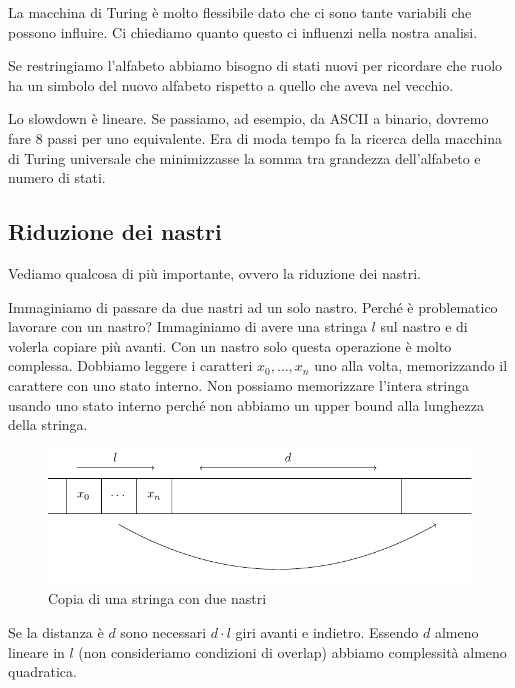 La macchina di Turing è molto flessibile dato che ci sono tante variabili che possono influire. Ci
chiediamo quanto questo ci influenzi nella nostra analisi.

Se restringiamo l'alfabeto abbiamo bisogno di stati nuovi per ricordare che ruolo ha un simbolo del
nuovo alfabeto rispetto a quello che aveva nel vecchio.

Lo slowdown è lineare. Se passiamo, ad esempio, da ASCII a binario, dovremo fare 8 passi per uno
equivalente. Era di moda tempo fa la ricerca della macchina di Turing universale che minimizzasse la
somma tra grandezza dell'alfabeto e numero di stati.


\subsection{Riduzione dei nastri}

Vediamo qualcosa di più importante, ovvero la riduzione dei nastri.

Immaginiamo di passare da due nastri ad un solo nastro. Perché è problematico lavorare con un
nastro? Immaginiamo di avere una stringa $l$ sul nastro e di volerla copiare più avanti. Con un
nastro solo questa operazione è molto complessa. Dobbiamo leggere i caratteri $x_{0},\dotsc,x_{n}$
uno alla volta, memorizzando il carattere con uno stato interno. Non possiamo memorizzare l'intera
stringa usando uno stato interno perché non abbiamo un upper bound alla lunghezza della stringa.

\begin{figure}[h]
    \begin{center}
        \includegraphics{./img/deterministic_complexity_classes/CopyString.pdf}
        \caption{Copia di una stringa con due nastri}
    \end{center}
\end{figure}

Se la distanza è $d$ sono necessari $d\cdot l$ giri avanti e indietro. Essendo $d$ almeno lineare in $l$
(non consideriamo condizioni di overlap) abbiamo complessità almeno quadratica.

